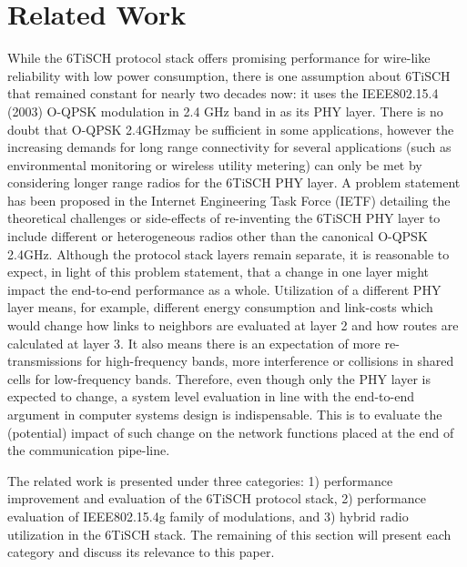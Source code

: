 \documentclass[journal]{IEEEtran}
\newcommand{\oqpsk}        {O-QPSK 2.4GHz}
\begin{document}
\section{Related Work}
\label{sec:related_work}


While the 6TiSCH protocol stack offers promising performance for wire-like reliability with low power consumption, there is one assumption about 6TiSCH that remained constant for nearly two decades now: it uses the IEEE802.15.4 (2003) O-QPSK modulation in 2.4 GHz band in as its PHY layer. 
There is no doubt that \oqpsk may be sufficient in some applications, however the increasing demands for long range connectivity for several applications (such as environmental monitoring or wireless utility metering) can only be met by considering longer range radios for the 6TiSCH PHY layer.
A problem statement has been proposed in the Internet Engineering Task Force (IETF) detailing the theoretical challenges or side-effects of re-inventing the 6TiSCH PHY layer to include different or heterogeneous radios other than the canonical \oqpsk \cite{j.munoz18problem}. 
Although the protocol stack layers remain separate, it is reasonable to expect, in light of this problem statement, that a change in one layer might impact the end-to-end performance as a whole. 
Utilization of a different PHY layer means, for example, different energy consumption and link-costs which would change how links to neighbors are evaluated at layer 2 and how routes are calculated at layer 3.
It also means there is an expectation of more re-transmissions for high-frequency bands, more interference or collisions in shared cells for low-frequency bands.
Therefore, even though only the PHY layer is expected to change, a system level evaluation in line with the end-to-end argument in computer systems design \cite{saltzer84endtoend} is indispensable.
This is to evaluate the (potential) impact of such change on the network functions placed at the end of the communication pipe-line. 

The related work is presented under three categories: 
    1) performance improvement and evaluation of the 6TiSCH protocol stack,
    2) performance evaluation of IEEE802.15.4g family of modulations, and
    3) hybrid radio utilization in the 6TiSCH stack. 
The remaining of this section will present each category and discuss its relevance to this paper.
\end{document}
